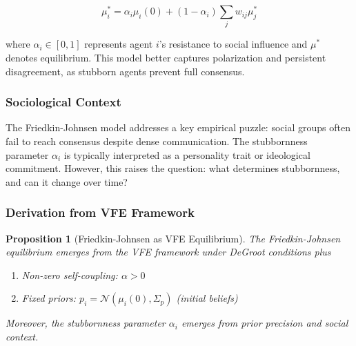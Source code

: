 \documentclass[12pt]{article}
\newtheorem{proposition}[theorem]{Proposition}
\begin{document}
\begin{equation}
\mu_i^* = \alpha_i \mu_i(0) + (1 - \alpha_i) \sum_j w_{ij} \mu_j^*
\label{eq:fj_classical}
\end{equation}

where $\alpha_i \in [0,1]$ represents agent $i$'s resistance to social influence and $\mu^*$ denotes equilibrium. This model better captures polarization and persistent disagreement, as stubborn agents prevent full consensus.

\subsubsection{Sociological Context}

The Friedkin-Johnsen model addresses a key empirical puzzle: social groups often fail to reach consensus despite dense communication. The stubbornness parameter $\alpha_i$ is typically interpreted as a personality trait or ideological commitment. However, this raises the question: what determines stubbornness, and can it change over time?

\subsubsection{Derivation from VFE Framework}

\begin{proposition}[Friedkin-Johnsen as VFE Equilibrium]
The Friedkin-Johnsen equilibrium emerges from the VFE framework under DeGroot conditions plus

\begin{enumerate}[label=(\roman*), start=7]
\item Non-zero self-coupling: $\alpha > 0$
\item Fixed priors: $p_i = \mathcal{N}(\mu_i(0), \Sigma_p)$ (initial beliefs)
\end{enumerate}

Moreover, the stubbornness parameter $\alpha_i$ emerges from prior precision and social context.
\end{proposition}
\end{document}
